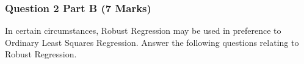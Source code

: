 \documentclass[a4paper,12pt]{article}
\begin{document}
%


\subsubsection*{Question 2 Part B (7 Marks)}



In certain circumstances, Robust Regression may be used in preference to Ordinary Least Squares Regression. Answer the following questions relating to Robust Regression. 
\end{document}
